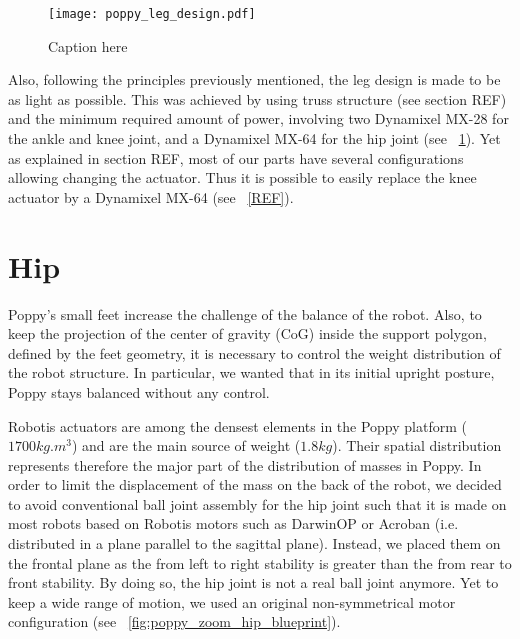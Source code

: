 \begin{figure}[p]
    \begin{center}
        \texttt{[image: poppy\_leg\_design.pdf]}
    \end{center}
    \caption{Caption here}
    \label{fig:poppy_leg_design}
\end{figure}


Also, following the principles previously mentioned, the leg design is made to be as light as possible. This was achieved by using truss structure (see section REF) and the minimum required amount of power, involving two Dynamixel MX-28 for the ankle and knee joint, and a Dynamixel MX-64 for the hip joint (see \figurename~\ref{fig:poppy_leg_design}). Yet as explained in section REF, most of our parts have several configurations allowing changing the actuator. Thus it is possible to easily replace the knee actuator by a Dynamixel MX-64 (see \figurename~\ref{REF}).



\section{Hip} %
\label{sec:hip}


Poppy's small feet increase the challenge of the balance of the robot. Also, to keep the projection of the center of gravity (CoG) inside the support polygon, defined by the feet geometry, it is necessary to control the weight distribution of the robot structure. In particular, we wanted that in its initial upright posture, Poppy stays balanced without any control.

Robotis actuators are among the densest elements in the Poppy platform ($ 1700 kg.m^{3} $) and are the main source of weight ($1.8 kg$). Their spatial distribution represents therefore the major part of the distribution of masses in Poppy. In order to limit the displacement of the mass on the back of the robot, we decided to avoid conventional ball joint assembly for the hip joint such that it is made on most robots based on Robotis motors such as DarwinOP or Acroban (i.e. distributed in a plane parallel to the sagittal plane). Instead, we placed them on the frontal plane as the from left to right stability is greater than the from rear to front stability. By doing so, the hip joint is not a real ball joint anymore. Yet to keep a wide range of motion, we used an original non-symmetrical motor configuration (see \figurename~\ref{fig:poppy_zoom_hip_blueprint}).


